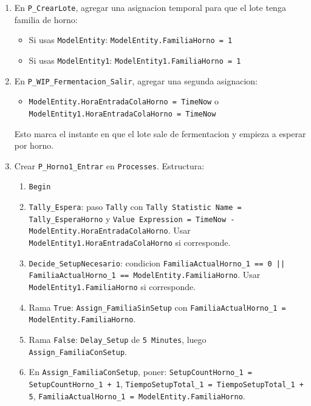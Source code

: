 \documentclass[11pt]{article}
\newcommand{\simio}[1]{\texttt{#1}}
\newcommand{\state}[1]{\texttt{#1}}
\newcommand{\proc}[1]{\texttt{#1}}
\begin{document}
\begin{enumerate}
\begin{itemize}
    \item \simio{Processing Time = 18}
    \item \simio{Units = Minutes}
  \end{itemize}
  Este \simio{18} es temporal para M3A con \state{ProductoIdx = 1}. En M3B/M4 se reemplaza por lectura desde tabla de familia.
  \item En \proc{P\_CrearLote}, agregar una asignacion temporal para que el lote tenga familia de horno:
  \begin{itemize}
    \item Si usas \simio{ModelEntity}: \state{ModelEntity.FamiliaHorno = 1}
    \item Si usas \simio{ModelEntity1}: \state{ModelEntity1.FamiliaHorno = 1}
  \end{itemize}
  \item En \proc{P\_WIP\_Fermentacion\_Salir}, agregar una segunda asignacion:
  \begin{itemize}
    \item \state{ModelEntity.HoraEntradaColaHorno = TimeNow} o \state{ModelEntity1.HoraEntradaColaHorno = TimeNow}
  \end{itemize}
  Esto marca el instante en que el lote sale de fermentacion y empieza a esperar por horno.
  \item Crear \proc{P\_Horno1\_Entrar} en \simio{Processes}. Estructura:
  \begin{enumerate}
    \item \simio{Begin}
    \item \simio{Tally\_Espera}: paso \simio{Tally} con \simio{Tally Statistic Name = Tally\_EsperaHorno} y \simio{Value Expression = TimeNow - ModelEntity.HoraEntradaColaHorno}. Usar \state{ModelEntity1.HoraEntradaColaHorno} si corresponde.
    \item \simio{Decide\_SetupNecesario}: condicion \state{FamiliaActualHorno\_1 == 0 || FamiliaActualHorno\_1 == ModelEntity.FamiliaHorno}. Usar \state{ModelEntity1.FamiliaHorno} si corresponde.
    \item Rama \simio{True}: \simio{Assign\_FamiliaSinSetup} con \state{FamiliaActualHorno\_1 = ModelEntity.FamiliaHorno}.
    \item Rama \simio{False}: \simio{Delay\_Setup} de \simio{5 Minutes}, luego \simio{Assign\_FamiliaConSetup}.
    \item En \simio{Assign\_FamiliaConSetup}, poner:
      \state{SetupCountHorno\_1 = SetupCountHorno\_1 + 1}, \state{TiempoSetupTotal\_1 = TiempoSetupTotal\_1 + 5}, \state{FamiliaActualHorno\_1 = ModelEntity.FamiliaHorno}.

\end{enumerate}
\end{enumerate}
\end{document}
